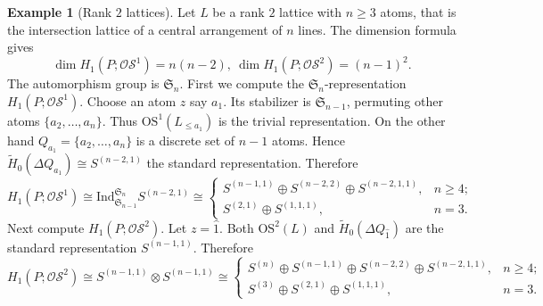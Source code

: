 \documentclass{amsart}
\numberwithin{equation}{section}
\theoremstyle{plain}
\theoremstyle{remark}
\theoremstyle{definition}
\newtheorem{ex}[thm]{Example}
\numberwithin{equation}{section}
\newcommand{\OS}{\mathrm{OS}}
\newcommand{\sOS}{\mathscr{OS}}
\begin{document}
\begin{ex}[Rank $2$ lattices]
Let $L$ be a rank $2$ lattice with $n\geq 3$ atoms, that is the intersection lattice of a central arrangement of $n$ lines. The dimension formula gives
\[
\dim H_1(P;\sOS^1)=n(n-2),~\dim H_1(P;\sOS^2)=(n-1)^2.
\]
The automorphism group is $\mathfrak{S}_n$. First we compute the $\mathfrak{S}_n$-representation $H_1(P;\sOS^1)$. Choose an atom $z$ say $a_1$. Its stabilizer is $\mathfrak{S}_{n-1}$, permuting other atoms $\{a_2,\ldots,a_n\}$. Thus $\OS^1(L_{\leq a_1})$ is the trivial representation. On the other hand $Q_{a_1}=\{a_2,\ldots,a_n\}$ is a discrete set of $n-1$ atoms. Hence $\widetilde{H}_0(\Delta Q_{a_1})\cong S^{(n-2,1)}$ the standard representation. Therefore
\[
H_1(P;\sOS^1)\cong\mathrm{Ind}^{\mathfrak{S}_n}_{\mathfrak{S}_{n-1}}S^{(n-2,1)}\cong\begin{cases}
    S^{(n-1,1)}\oplus S^{(n-2,2)}\oplus S^{(n-2,1,1)}, & n\geq 4;\\
    S^{(2,1)}\oplus S^{(1,1,1)}, & n=3.
\end{cases}
\]
Next compute $H_1(P;\sOS^2)$. Let $z=\hat1$. Both $\OS^2(L)$ and $\widetilde{H}_0(\Delta Q_{\hat 1})$ are the standard representation $S^{(n-1,1)}$. Therefore
\[
H_1(P;\sOS^2)\cong S^{(n-1,1)}\otimes S^{(n-1,1)}\cong \begin{cases}
    S^{(n)}\oplus S^{(n-1,1)}\oplus S^{(n-2,2)}\oplus S^{(n-2,1,1)}, & n\geq 4;\\
    S^{(3)}\oplus S^{(2,1)}\oplus S^{(1,1,1)}, & n=3.
\end{cases}
\]
\end{ex}
\end{document}
